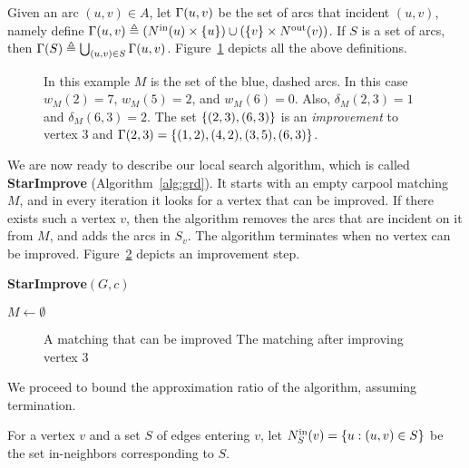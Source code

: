 Given an arc $(u,v) \in A$, let $\inc(u,v)$ be the set of arcs that
incident $(u, v)$, namely define
\(
\inc(u,v) \eqdf (\nin[](u) \times \{u\}) \cup (\{v\} \times \nout[](v))
\).
If $S$ is a set of arcs, then $\inc(S) \eqdf \bigcup_{(u,v) \in
S} \inc(u,v)$.
%
Figure~\ref{fig:defs} depicts all the above definitions.

\begin{figure}
\centering

\caption{In this example $M$ is the set of the blue, dashed arcs.
In this case $w_M(2) = 7$, $w_M(5) = 2$, and $w_M(6) = 0$.  Also,
$\delta_M(2, 3) = 1$ and $\delta_M(6, 3) = 2$.  The set $\set{(2,3),
(6,3)}$ is an \emph{improvement} to vertex 3 and $\inc(2,3)
= \set{(1,2),(4,2),(3,5),(6,3)}$.}
\label{fig:defs}
\end{figure}

We are now ready to describe our local search algorithm, which is
called \textbf{StarImprove} (Algorithm~\ref{alg:grd}).  It starts with
an empty carpool matching $M$, and in every iteration it looks for a
vertex that can be improved.  If there exists such a vertex $v$, then
the algorithm removes the arcs that are incident on it from $M$, and
adds the arcs in $S_v$.  The algorithm terminates when no vertex can
be improved.  Figure~\ref{fig:improvement} depicts an improvement
step.

\begin{algorithm}
\caption{\textbf{StarImprove}$(G,c)$}
\label{alg:grd}
\begin{small}
$M \gets \emptyset$ \\
\end{small}
\end{algorithm}

\begin{figure}
\centering

\caption[]{
\label{fig:improvement}
A matching that can be improved
The matching after improving vertex 3
}
\end{figure}

We proceed to bound the approximation ratio of the algorithm, assuming
termination.

For a vertex $v$ and a set $S$ of edges entering $v$, let $\nin[S](v)
= \set{u : (u,v) \in S}$ be the set in-neighbors corresponding to $S$.

